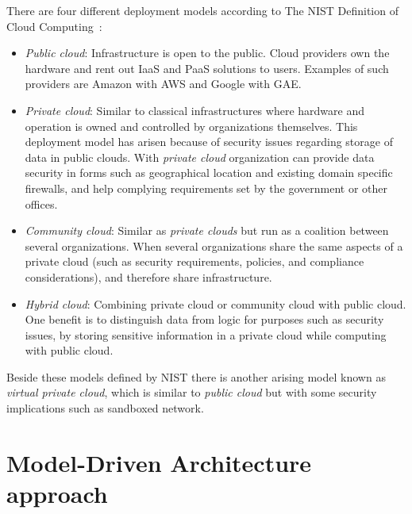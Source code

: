 There are four different deployment models according to The 
NIST Definition of Cloud Computing~\cite{nist:mell11}:
\begin{itemize}
  \item \emph{Public cloud}: Infrastructure is open to the public.
    Cloud providers own the hardware and rent out IaaS and PaaS solutions to users.
    Examples of such providers are Amazon with AWS and Google with GAE.
  \item \emph{Private cloud}: Similar to classical infrastructures where hardware and
    operation is owned and controlled by organizations themselves.
    This deployment model has arisen because of security issues regarding storage 
    of data in public clouds. With \emph{private cloud} organization can provide 
    data security in forms such as geographical location and existing domain specific firewalls,
    and help complying requirements set by the government or other offices.
  \item \emph{Community cloud}: Similar as \emph{private clouds} but run as a
    coalition between several organizations.
    When several organizations share the same aspects of
    a private cloud (such as security requirements, policies, and compliance considerations),
    and therefore share infrastructure. 
  \item \emph{Hybrid cloud}: Combining private cloud or community cloud with public cloud.
    One benefit is to distinguish data from logic for purposes such as security issues,
    by storing sensitive information in a private cloud while computing with public cloud.
\end{itemize}

Beside these models defined by NIST there is another arising model known as 
\emph{virtual private cloud}, which is similar to \emph{public cloud} 
but with some security implications such as sandboxed network.

\section{Model-Driven Architecture approach}

